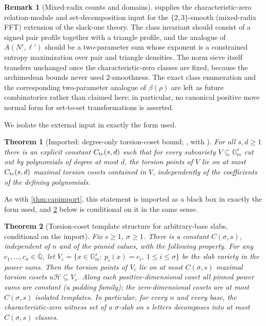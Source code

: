 \documentclass[11pt]{article}
\newtheorem{theorem}{Theorem}[section]
\theoremstyle{definition}
\newtheorem{remark}[remark]{Remark}
\newcommand{\Q}{\mathbb Q}
\newcommand{\Acl}{A}
\begin{document}
\begin{remark}[Mixed-radix counts and domains]\label{rem:23count}
 supplies the characteristic-zero relation-module and set-decomposition input for the $\{2,3\}$-smooth (mixed-radix FFT) extension of the slack-one theory.  The class invariant should consist of a signed pair profile together with a triangle profile, and the analogue of $\Acl(N',\ell')$ should be a two-parameter sum whose exponent is a constrained entropy maximization over pair and triangle densities.  The norm sieve itself transfers unchanged once the characteristic-zero classes are fixed, because the archimedean bounds never used $2$-smoothness.  The exact class enumeration and the corresponding two-parameter analogue of $\beta(\rho)$ are left as future combinatorics rather than claimed here; in particular, no canonical positive move normal form for set-to-set transformations is asserted.
\end{remark}

We isolate the external input in exactly the form used.

\begin{theorem}[Imported: degree-only torsion-coset bound; \cite{AS12}, with \cite{Laurent84,ESS02,BS02}]\label{thm:torsionimport}
For all $s,d\ge1$ there is an explicit constant $C_{\rm tc}(s,d)$ such that for every subvariety $V\subseteq\mathbb G_m^s$ cut out by polynomials of degree at most $d$, the torsion points of $V$ lie on at most $C_{\rm tc}(s,d)$ maximal torsion cosets contained in $V$, independently of the coefficients of the defining polynomials.
\end{theorem}

As with \cref{thm:capimport}, this statement is imported as a black box in exactly the form used, and \cref{thm:templates} below is conditional on it in the same sense.

\begin{theorem}[Torsion-coset template structure for arbitrary-base slabs, conditional on the import]\label{thm:templates}
Fix $s\ge1$, $\sigma\ge1$.  There is a constant $C(\sigma,s)$, independent of $n$ and of the pinned values, with the following property.  For any $c_1,\dots,c_\sigma\in\overline{\Q}$, let $V_c=\{x\in\mathbb G_m^s:\ p_i(x)=c_i,\ 1\le i\le\sigma\}$ be the slab variety in the power sums.  Then the torsion points of $V_c$ lie on at most $C(\sigma,s)$ maximal torsion cosets $u\mathcal H\subseteq V_c$.  Along each positive-dimensional coset all pinned power sums are constant (a padding family); the zero-dimensional cosets are at most $C(\sigma,s)$ isolated templates.  In particular, for every $n$ and every base, the characteristic-zero witness set of a $\sigma$-slab on $s$ letters decomposes into at most $C(\sigma,s)$ classes.
\end{theorem}
\end{document}
